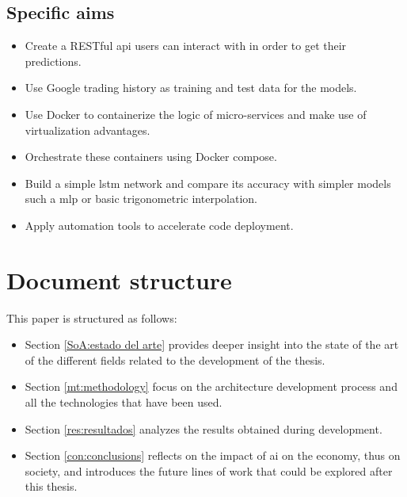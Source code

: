 \subsection{Specific aims}
\begin{itemize}
    \item Create a \gls{RESTful} \gls{api} users can interact with in order to get their predictions.
    \item Use Google trading history as training and test data for the models.
    \item Use \gls{Docker} to containerize the logic of micro-services and make use of virtualization advantages.
    \item Orchestrate these containers using \gls{Docker} compose.
    \item Build a simple \gls{lstm} network and compare its accuracy with simpler models such a \gls{mlp} or basic trigonometric interpolation.
    \item Apply automation tools to accelerate code deployment.
\end{itemize}

\section{Document structure}

This paper is structured as follows:

\begin{itemize}
    \item Section \ref{SoA:estado del arte} provides deeper insight into the state of the art of the different fields related to the development of the thesis.
    \item Section \ref{mt:methodology} focus on the architecture development process and all the technologies that have been used.
    \item Section \ref{res:resultados} analyzes the results obtained during development.
    \item Section \ref{con:conclusions} reflects on the impact of \gls{ai} on the economy, thus on society, and introduces the future lines of work that could be explored after this thesis.
\end{itemize}